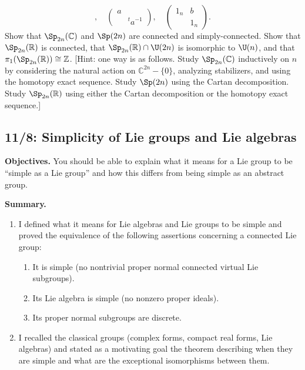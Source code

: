 \documentclass[reqno]{amsart} 
\begin{document}
\begin{homework}
\begin{enumerate}
\begin{equation*}
,
      \quad
      \begin{pmatrix}
        a &  \\
         & {}^t a^{-1}
       \end{pmatrix}
,
       \quad
       \begin{pmatrix}
         1_n & b \\
          & 1_n
       \end{pmatrix}
.
    \end{equation*}
    Show that $\Sp_{2n}(\mathbb{C})$ and $\Sp(2 n)$
    are connected and simply-connected.
    Show that $\Sp_{2n}(\mathbb{R})$
    is connected,
    that $\Sp_{2n}(\mathbb{R}) \cap \U(2n)$
    is isomorphic to $\U(n)$,
    and that $\pi_1(\Sp_{2n}(\mathbb{R})) \cong \mathbb{Z}$.
    [Hint: one way is as follows.  Study $\Sp_{2n}(\mathbb{C})$
    inductively on $n$ 
    by considering the natural action
    on $\mathbb{C}^{2 n} - \{0\}$,
    analyzing stabilizers, and using the homotopy exact sequence.
    Study
    $\Sp(2 n)$ 
    using the Cartan decomposition.
    Study 
    $\Sp_{2n}(\mathbb{R})$ using either the Cartan decomposition or the homotopy exact sequence.]
  \end{enumerate}
\end{homework}

\newpage
\subsection{11/8: Simplicity of Lie groups and Lie algebras}
\label{sec:org6225804}
\textbf{Objectives.} You should be able to explain what it means for a Lie
group to be ``simple as a Lie group'' and how this differs from being
simple as an abstract group.

\textbf{Summary.}
\begin{enumerate}
\item I defined what it means for Lie algebras and Lie groups to be
simple and proved the equivalence of the following assertions
concerning a connected Lie group:
\begin{enumerate}
\item It is simple (no nontrivial proper normal connected virtual Lie subgroups).
\item Its Lie algebra is simple (no nonzero proper ideals).
\item Its proper normal subgroups are discrete.
\end{enumerate}
\item I recalled the classical groups (complex forms, compact real forms,
Lie algebras) and stated as a motivating goal the theorem
describing when they are simple and what are the exceptional
isomorphisms between them.
\end{enumerate}
\end{document}
